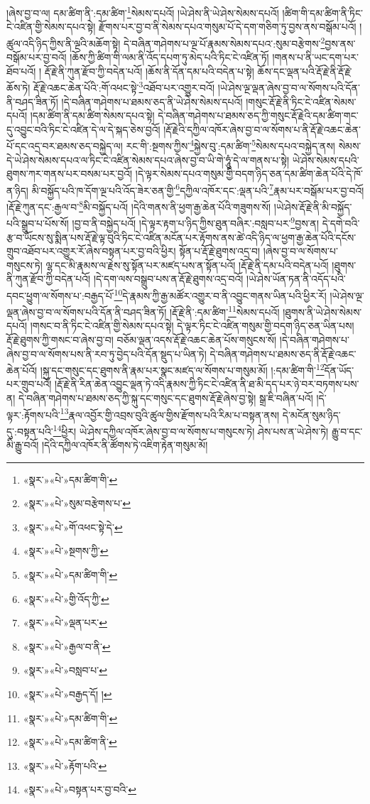 །ཞེས་བྱ་བ་ལ། དམ་ཚིག་ནི་:དམ་ཚིག་\footnote{«སྣར་»«པེ་»དམ་ཚིག་གི་}སེམས་དཔའོ། །ཡེ་ཤེས་ནི་ཡེ་ཤེས་སེམས་དཔའོ། །ཚིག་གི་དམ་ཚིག་ནི་ཏིང་ངེ་འཛིན་གྱི་སེམས་དཔའ་སྟེ། རྫོགས་པར་བྱ་བ་ནི་སེམས་དཔའ་གསུམ་པོ་དེ་དག་གཅིག་ཏུ་བྱས་ནས་བསྒོམ་པའོ། །ཚུལ་འདི་ཉིད་ཀྱིས་ནི་ལྔའི་མཆོག་སྟེ། དེ་བཞིན་གཤེགས་པ་ལྔ་པོ་རྣམས་སེམས་དཔའ་:སུམ་བརྩེགས་\footnote{«སྣར་»«པེ་»སུམ་བརྩེགས་པ་}བྱས་ནས་བསྒོམ་པར་བྱ་བའོ། །ཆོས་ཀྱི་ཚིག་གི་ལམ་ནི་འོད་དཔག་ཏུ་མེད་པའི་ཏིང་ངེ་འཛིན་ཏོ། །གནས་པ་ནི་ཡང་དག་པར་ཐོབ་པའོ། །
རྡོ་རྗེ་ནི་ཀུན་རྫོབ་ཀྱི་བདེན་པའོ། །ཆོས་ནི་དོན་དམ་པའི་བདེན་པ་སྟེ། ཆོས་དང་ལྡན་པའི་རྡོ་རྗེ་ནི་རྡོ་རྗེ་ཆོས་ཏེ། རྡོ་རྗེ་འཆང་ཆེན་པོའི་:གོ་འཕང་སྟེ་\footnote{«སྣར་»«པེ་»གོ་འཕང་སྟེ་དེ་}འཐོབ་པར་འགྱུར་བའོ། །ཡེ་ཤེས་ལྔ་ལྡན་ཞེས་བྱ་བ་ལ་སོགས་པའི་དོན་ནི་བཤད་ཟིན་ཏོ། །དེ་བཞིན་གཤེགས་པ་ཐམས་ཅད་ནི་ཡེ་ཤེས་སེམས་དཔའོ། །གསུང་རྡོ་རྗེ་ནི་ཏིང་ངེ་འཛིན་སེམས་དཔའོ། །དམ་ཚིག་ནི་དམ་ཚིག་སེམས་དཔའ་སྟེ། དེ་བཞིན་གཤེགས་པ་ཐམས་ཅད་ཀྱི་གསུང་རྡོ་རྗེའི་དམ་ཚིག་གང་དུ་འབྱུང་བའི་ཏིང་ངེ་འཛིན་དེ་ལ་དེ་སྐད་ཅེས་བྱའོ། །རྡོ་རྗེའི་དཀྱིལ་འཁོར་ཞེས་བྱ་བ་ལ་སོགས་པ་ནི་རྡོ་རྗེ་འཆང་ཆེན་པོ་དང་འདྲ་བར་ཐམས་ཅད་བསྐྱེད་ལ། རང་གི་:སྔགས་ཀྱིས་\footnote{«སྣར་»«པེ་»སྔགས་ཀྱི་}སྐྱེས་བུ་:དམ་ཚིག་\footnote{«སྣར་»«པེ་»དམ་ཚིག་གི་}སེམས་དཔའ་བསྐྱེད་ནས། སེམས་དེ་ཡེ་ཤེས་སེམས་དཔའ་ལ་ཏིང་ངེ་འཛིན་སེམས་དཔའ་ཞེས་བྱ་བ་ཡི་གེ་ཧཱུཾ་དེ་ལ་གནས་པ་སྟེ། ཡེ་ཤེས་སེམས་དཔའི་ཐུགས་ཀར་གནས་པར་བསམ་པར་བྱའོ། །དེ་ལྟར་སེམས་དཔའ་གསུམ་གྱི་བདག་ཉིད་ཅན་དམ་ཚིག་ཆེན་པོའི་དེ་ཁོ་ན་ཉིད། མི་བསྐྱོད་པའི་ཁ་དོག་ལྔ་པའི་འོད་ཟེར་ཅན་གྱི་\footnote{«སྣར་»«པེ་»གྱི་འོད་ཀྱི་}དཀྱིལ་འཁོར་དང་:ལྡན་པའི་\footnote{«སྣར་»«པེ་»ལྡན་པར་}རྣམ་པར་བསྒོམ་པར་བྱ་བའོ། །རྡོ་རྗེ་ཀུན་དང་:རྒྱལ་བ་\footnote{«སྣར་»«པེ་»རྒྱལ་བ་ནི་}མི་བསྐྱོད་པའོ། །དེའི་གནས་ནི་ཕྱག་རྒྱ་ཆེན་པོའི་གཟུགས་སོ། །ཡེ་ཤེས་རྡོ་རྗེ་ནི་མི་བསྐྱོད་པའི་སྒྲུབ་པ་པོས་སོ། །བྱ་བ་ནི་བསྐྱེད་པའོ། །དེ་ལྟར་རྟག་པ་ཉིད་ཀྱིས་ཐུན་བཞིར་:བསླབ་པར་\footnote{«སྣར་»«པེ་»བསླབ་པ་}བྱས་ན། དེ་དགེ་བའི་རྩ་བ་ཡོངས་སུ་སྨིན་པས་རྡོ་རྗེ་ལྟ་བུའི་ཏིང་ངེ་འཛིན་མངོན་པར་རྟོགས་ནས་ཚེ་འདི་ཉིད་ལ་ཕྱག་རྒྱ་ཆེན་པོའི་དངོས་གྲུབ་འཐོབ་པར་འགྱུར་རོ་ཞེས་བསྟན་པར་བྱ་བའི་ཕྱིར། སྟོན་པ་རྡོ་རྗེ་ཐུགས་འདྲ་བ། །ཞེས་བྱ་བ་ལ་སོགས་པ་གསུངས་ཏེ། ལྷ་དང་མི་རྣམས་ལ་རྗེས་སུ་སྟོན་པར་མཛད་པས་ན་སྟོན་པའོ། །རྡོ་རྗེ་ནི་དམ་པའི་བདེན་པའོ། །ཐུགས་ནི་ཀུན་རྫོབ་ཀྱི་བདེན་པའོ། །དེ་དག་ལས་བསྒྲུབ་པས་ན་རྡོ་རྗེ་ཐུགས་འདྲ་བའོ། །ཡེ་ཤེས་ཡོན་ཏན་ནི་འདོད་པའི་དབང་ཕྱུག་ལ་སོགས་པ་:བརྒྱད་པོ་\footnote{«སྣར་»«པེ་»བརྒྱད་དོ། །}དེ་རྣམས་ཀྱི་རྒྱ་མཚོར་འགྱུར་བ་ནི་འབྱུང་གནས་ཡིན་པའི་ཕྱིར་རོ། །ཡེ་ཤེས་ལྔ་ལྡན་ཞེས་བྱ་བ་ལ་སོགས་པའི་དོན་ནི་བཤད་ཟིན་ཏོ། །རྡོ་རྗེ་ནི་:དམ་ཚིག་\footnote{«སྣར་»«པེ་»དམ་ཚིག་གི་}སེམས་དཔའོ། །ཐུགས་ནི་ཡེ་ཤེས་སེམས་དཔའོ། །གསང་བ་ནི་ཏིང་ངེ་འཛིན་གྱི་སེམས་དཔའ་སྟེ། དེ་ལྟར་ཏིང་ངེ་འཛིན་གསུམ་གྱི་བདག་ཉིད་ཅན་ཡིན་པས། རྡོ་རྗེ་ཐུགས་ཀྱི་གསང་བ་ཞེས་བྱ་བ། བཅོམ་ལྡན་འདས་རྡོ་རྗེ་འཆང་ཆེན་པོས་གསུངས་སོ། །དེ་བཞིན་གཤེགས་པ་ཞེས་བྱ་བ་ལ་སོགས་པས་ནི་རབ་ཏུ་བྱེད་པའི་དོན་སྡུད་པ་ཡིན་ཏེ། དེ་བཞིན་གཤེགས་པ་ཐམས་ཅད་ནི་རྡོ་རྗེ་འཆང་ཆེན་པོའོ། །སྐུ་དང་གསུང་དང་ཐུགས་ནི་རྣམ་པར་སྣང་མཛད་ལ་སོགས་པ་གསུམ་མོ། །:དམ་ཚིག་གི་\footnote{«སྣར་»«པེ་»དམ་ཚིག་ནི་}དོན་ཡོད་པར་གྲུབ་པའོ། །རྡོ་རྗེ་ནི་རིན་ཆེན་འབྱུང་ལྡན་ཏེ་འདི་རྣམས་ཀྱི་ཏིང་ངེ་འཛིན་ནི་ཐ་མི་དད་པར་ཉེ་བར་བཏགས་པས་ན། དེ་བཞིན་གཤེགས་པ་ཐམས་ཅད་ཀྱི་སྐུ་དང་གསུང་དང་ཐུགས་རྡོ་རྗེ་ཞེས་བྱ་སྟེ། སྒྲ་ཇི་བཞིན་པའོ། །དེ་ལྟར་:རྟོགས་པའི་\footnote{«སྣར་»«པེ་»རྟོག་པའི་}རྣལ་འབྱོར་གྱི་འབྲས་བུའི་ཚུལ་གྱིས་རྫོགས་པའི་རིམ་པ་བསྟན་ནས། དེ་མངོན་སུམ་ཉིད་དུ་:བསྟན་པའི་\footnote{«སྣར་»«པེ་»བསྟན་པར་བྱ་བའི་}ཕྱིར། ཡེ་ཤེས་དཀྱིལ་འཁོར་ཞེས་བྱ་བ་ལ་སོགས་པ་གསུངས་ཏེ། ཤེས་པས་ན་ཡེ་ཤེས་ཏེ། རྒྱུ་བ་དང་མི་རྒྱུ་བའོ། །དེའི་དཀྱིལ་འཁོར་ནི་ཚོགས་ཏེ་འཇིག་རྟེན་གསུམ་མོ། 